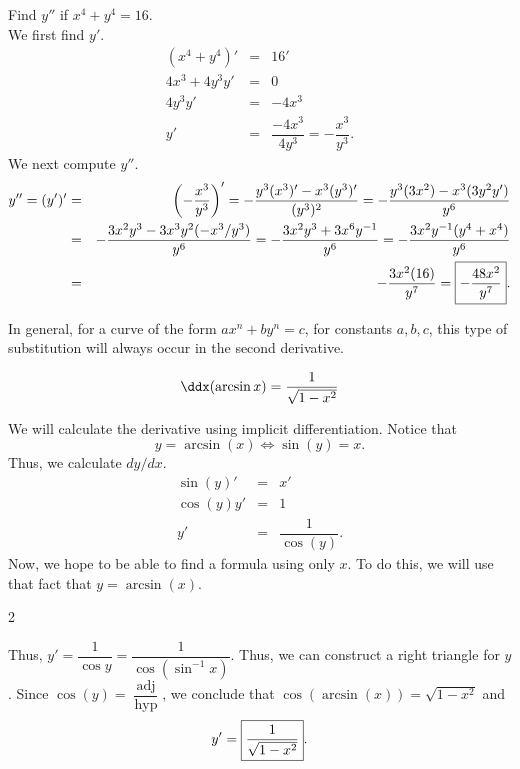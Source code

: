 \documentclass{book}
\DeclareMathOperator{\hyp}{hyp}
\DeclareMathOperator{\adj}{adj}
\begin{document}
\begin{Exam} Find $y''$ if $x^4+y^4 = 16$.\\

We first find $y'$. 
\begin{eqnarray*}
(x^4+y^4)' &=& 16'\\
4x^3 + 4y^3y' &=& 0\\
4y^3y' &=& -4x^3\\ 
y' &=& \dfrac{-4x^3}{4y^3} = -\dfrac{x^3}{y^3}.
\end{eqnarray*}
  We next compute $y''$.
\begin{eqnarray*}
y'' = (y')' &=& \left(-\dfrac{x^3}{y^3}\right)' = -\dfrac{y^3(x^3)' - x^3(y^3)'}{(y^3)^2} = -\dfrac{y^3(3x^2) - x^3(3y^2y')}{y^6}\\
& =& -\dfrac{3x^2y^3 - 3x^3y^2(-x^3/y^3)}{y^6} = -\dfrac{3x^2y^3 + 3x^6y^{-1}}{y^6} = - \dfrac{3x^2y^{-1}(y^4 + x^4)}{y^6}\\
 &=& - \dfrac{3x^2(16)}{y^7} = \fbox{$-\dfrac{48x^2}{y^7}$}. 
\end{eqnarray*} 
\end{Exam}\vs

In general, for a curve of the form $ax^n + by^n = c$, for constants $a,b,c$, this type of substitution will always occur in the second derivative.

\begin{Thm} \[\ddx(\arcsin x) = \dfrac{1}{\sqrt{1-x^2}}\]\end{Thm}
\begin{pf}
We will calculate the derivative using implicit differentiation. Notice that \[y = \arcsin (x) \Longleftrightarrow \sin(y) = x.\]
Thus, we calculate $dy/dx$.
\begin{eqnarray*}
\sin(y)' &=& x'\\
 \cos(y)y' & =& 1\\
  y' &=& \dfrac{1}{\cos(y)}.
  \end{eqnarray*}
 Now, we hope to be able to find a formula using only $x$. To do this, we will use that fact that $y = \arcsin(x)$. 

\begin{multicols}{2}
\begin{center}
\end{center}\columnbreak

Thus, $y' = \dfrac{1}{\cos y} = \dfrac{1}{\cos(\sin^{-1}x)}$. Thus, we can construct a right triangle for $y$. Since $\cos(y) = \dfrac{\adj}{\hyp}$, we conclude that $\cos(\arcsin(x)) = \sqrt{1-x^2}$ and \[y' = \fbox{$\dfrac{1}{\sqrt{1-x^2}}$}. \]
\end{multicols}
\end{pf}\vs
\end{document}
